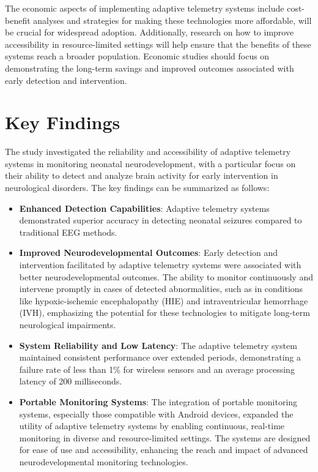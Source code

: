 \documentclass[12pt,journal,compsoc]{IEEEtran}
\begin{document}
The economic aspects of implementing adaptive telemetry systems include cost-benefit analyses and strategies for making these technologies more affordable, will be crucial for widespread adoption. Additionally, research on how to improve accessibility in resource-limited settings will help ensure that the benefits of these systems reach a broader population. Economic studies should focus on demonstrating the long-term savings and improved outcomes associated with early detection and intervention.


\section{Key Findings}

The study investigated the reliability and accessibility of adaptive telemetry systems in monitoring neonatal neurodevelopment, with a particular focus on their ability to detect and analyze brain activity for early intervention in neurological disorders. The key findings can be summarized as follows:

\begin{itemize}
    \item \textbf{Enhanced Detection Capabilities}: Adaptive telemetry systems demonstrated superior accuracy in detecting neonatal seizures compared to traditional EEG methods. 
    \item \textbf{Improved Neurodevelopmental Outcomes}: Early detection and intervention facilitated by adaptive telemetry systems were associated with better neurodevelopmental outcomes. The ability to monitor continuously and intervene promptly in cases of detected abnormalities, such as in conditions like hypoxic-ischemic encephalopathy (HIE) and intraventricular hemorrhage (IVH), emphasizing the potential for these technologies to mitigate long-term neurological impairments.
    \item \textbf{System Reliability and Low Latency}: The adaptive telemetry system maintained consistent performance over extended periods, demonstrating a failure rate of less than 1\% for wireless sensors and an average processing latency of 200 milliseconds.  
    \item \textbf{Portable Monitoring Systems}: The integration of portable monitoring systems, especially those compatible with Android devices, expanded the utility of adaptive telemetry systems by enabling continuous, real-time monitoring in diverse and resource-limited settings. The systems are designed for ease of use and accessibility, enhancing the reach and impact of advanced neurodevelopmental monitoring technologies.
\end{itemize}
\end{document}
